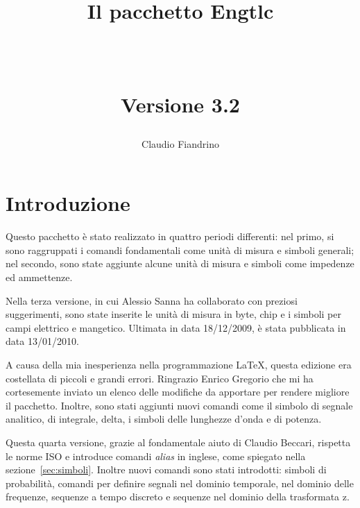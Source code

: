\documentclass[11pt,a4paper,openany]{book}
\begin{document}
\frontmatter
\begin{titlepage}
\title{\begin{huge}\textbf{Il pacchetto \textsf{Engtlc}}\end{huge}\\[.5cm]
       \begin{large}Versione 3.2\end{large}}
\author{\begin{LARGE}Claudio Fiandrino \end{LARGE}}
\maketitle
\end{titlepage}
\hypersetup{urlcolor=blue}
\hypersetup{linkcolor=blue}
\pagestyle{fancy}
\renewcommand{\chaptermark}[1]{%
 \markboth{\MakeUppercase{%
 \chaptername}\ \thechapter.%
 \ #1}{}}
\renewcommand{\sectionmark}[1]{\markright{\thesection.\ #1}}
\fancyhead[RO,LE]{\thepage}
\fancyhead[RE]{\leftmark}
\fancyhead[LO]{\rightmark}
\fancyfoot{}
\tableofcontents

\mainmatter
\chapter{Introduzione}
Questo pacchetto è stato realizzato in quattro periodi differenti: nel primo, si sono raggruppati i comandi fondamentali come unità di misura e simboli generali; nel secondo, sono state aggiunte alcune unità di misura e simboli come impedenze ed ammettenze.

Nella terza versione, in cui Alessio Sanna ha collaborato con preziosi suggerimenti, sono state inserite le unità di misura in byte, chip e i simboli per campi elettrico e mangetico. Ultimata in data 18/12/2009, è stata pubblicata in data 13/01/2010.

A causa della mia inesperienza nella programmazione \LaTeX{}, questa edizione era costellata di piccoli e grandi errori. Ringrazio Enrico Gregorio che mi ha cortesemente inviato un elenco delle modifiche da apportare per rendere migliore il pacchetto. Inoltre, sono stati aggiunti nuovi comandi come il simbolo di segnale analitico, di integrale, delta, i simboli delle lunghezze d'onda e di potenza.

Questa quarta versione, grazie al fondamentale aiuto di Claudio Beccari, rispetta le norme ISO e introduce comandi \emph{alias} in inglese, come spiegato nella sezione~\ref{sec:simboli}. Inoltre nuovi comandi sono stati introdotti: simboli di probabilità, comandi per definire segnali nel dominio temporale, nel dominio delle frequenze, sequenze a tempo discreto e sequenze nel dominio della trasformata z.
\end{document}
